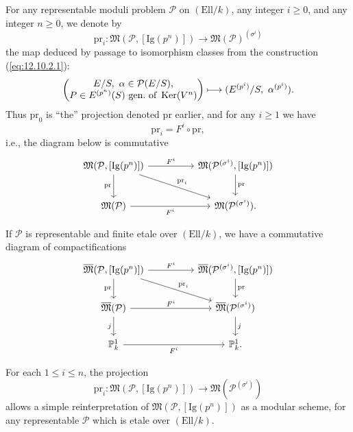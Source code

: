 \kmitem\label{item:12.10.3}
For any representable moduli problem $\mathcal{P}$ on $(\mathrm{Ell}/k)$, any integer $i \ge 0$, and any integer $n \ge 0$, we denote by
\[
\mathrm{pr}_i : \mathfrak{M}(\mathcal{P}, [\mathrm{Ig}(p^n)]) \to \mathfrak{M}(\mathcal{P})^{(\sigma^i)}
\]
the map deduced by passage to isomorphism classes from the construction (\ref{eq:12.10.2.1}):
\[
\begin{pmatrix}
E/S,\ \alpha \in \mathcal{P}(E/S), \\
P \in E^{(p^n)}(S)\ \text{gen.\ of } \operatorname{Ker}(V^n)
\end{pmatrix}
\longmapsto (E^{(p^i)}/S,\ \alpha^{(p^i)}) .
\]
Thus $\mathrm{pr}_0$ is ``the'' projection denoted $\mathrm{pr}$ earlier, and for any $i \ge 1$ we have
\[
\mathrm{pr}_i = F^i \circ \mathrm{pr} ,
\]
i.e., the diagram below is commutative
\[
\begin{tikzcd}[row sep=2.2em, column sep=huge]
\mathfrak{M}(\mathcal{P}, [\mathrm{Ig}(p^n)]) \arrow[r, "F^i"] \arrow[d, "\mathrm{pr}"'] \arrow[rd, "\mathrm{pr}_i"] & \mathfrak{M}(\mathcal{P}^{(\sigma^i)}, [\mathrm{Ig}(p^n)]) \arrow[d, "\mathrm{pr}"] \\
\mathfrak{M}(\mathcal{P}) \arrow[r, "F^i"'] & \mathfrak{M}(\mathcal{P}^{(\sigma^i)}) .
\end{tikzcd}
\]

\kmitem\label{item:12.10.4}
If $\mathcal{P}$ is representable and finite etale over $(\mathrm{Ell}/k)$, we have a commutative diagram of compactifications
\[
\begin{tikzcd}[row sep=2em, column sep=huge]
\overline{\mathfrak{M}}(\mathcal{P}, [\mathrm{Ig}(p^n)]) \arrow[r, "F^i"] \arrow[d, "\mathrm{pr}"'] \arrow[rd, "\mathrm{pr}_i"] & \overline{\mathfrak{M}}(\mathcal{P}^{(\sigma^i)}, [\mathrm{Ig}(p^n)]) \arrow[d, "\mathrm{pr}"] \\
\overline{\mathfrak{M}}(\mathcal{P}) \arrow[r, "F^i"] \arrow[d, "j"'] & \overline{\mathfrak{M}}(\mathcal{P}^{(\sigma^i)}) \arrow[d, "j"] \\
\mathbb{P}^1_k \arrow[r, "F^i"'] & \mathbb{P}^1_k .
\end{tikzcd}
\]

\kmitem\label{item:12.10.5}
For each $1 \le i \le n$, the projection
\[
\mathrm{pr}_i : \mathfrak{M}(\mathcal{P}, [\mathrm{Ig}(p^n)]) \to \mathfrak{M}(\mathcal{P}^{(\sigma^i)})
\]
allows a simple reinterpretation of $\mathfrak{M}(\mathcal{P}, [\mathrm{Ig}(p^n)])$ as a modular scheme, for any representable $\mathcal{P}$ which is etale over $(\mathrm{Ell}/k)$.

